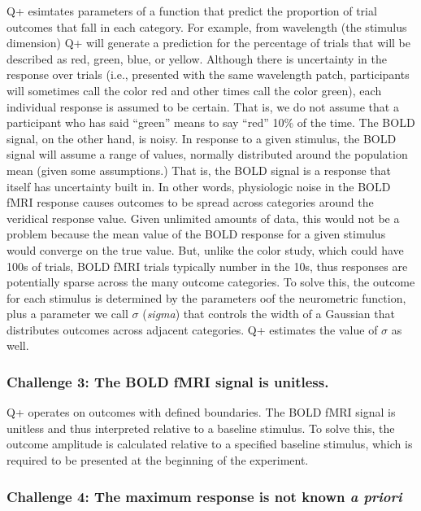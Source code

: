 \documentclass[
  english,
  man,floatsintext]{apa6}
\begin{document}
Q+ esimtates parameters of a function that predict the proportion of trial outcomes that fall in each category. For example, from wavelength (the stimulus dimension) Q+ will generate a prediction for the percentage of trials that will be described as red, green, blue, or yellow. Although there is uncertainty in the response over trials (i.e., presented with the same wavelength patch, participants will sometimes call the color red and other times call the color green), each individual response is assumed to be certain. That is, we do not assume that a participant who has said \enquote{green} means to say \enquote{red} 10\% of the time. The BOLD signal, on the other hand, is noisy. In response to a given stimulus, the BOLD signal will assume a range of values, normally distributed around the population mean (given some assumptions.) That is, the BOLD signal is a response that itself has uncertainty built in. In other words, physiologic noise in the BOLD fMRI response causes outcomes to be spread across categories around the veridical response value. Given unlimited amounts of data, this would not be a problem because the mean value of the BOLD response for a given stimulus would converge on the true value. But, unlike the color study, which could have 100s of trials, BOLD fMRI trials typically number in the 10s, thus responses are potentially sparse across the many outcome categories. To solve this, the outcome for each stimulus is determined by the parameters oof the neurometric function, plus a parameter we call \(\sigma\) (\emph{sigma}) that controls the width of a Gaussian that distributes outcomes across adjacent categories. Q+ estimates the value of \(\sigma\) as well.

\hypertarget{challenge-3-the-bold-fmri-signal-is-unitless.}{%
\subsubsection{Challenge 3: The BOLD fMRI signal is unitless.}\label{challenge-3-the-bold-fmri-signal-is-unitless.}}

Q+ operates on outcomes with defined boundaries. The BOLD fMRI signal is unitless and thus interpreted relative to a baseline stimulus. To solve this, the outcome amplitude is calculated relative to a specified baseline stimulus, which is required to be presented at the beginning of the experiment.

\hypertarget{challenge-4-the-maximum-response-is-not-known-a-priori}{%
\subsubsection{\texorpdfstring{Challenge 4: The maximum response is not known \emph{a priori}}{Challenge 4: The maximum response is not known a priori}}\label{challenge-4-the-maximum-response-is-not-known-a-priori}}
\end{document}
